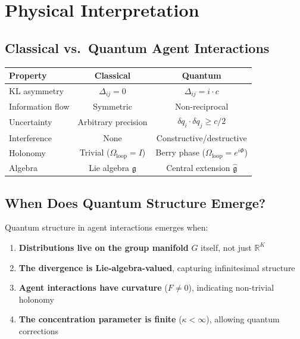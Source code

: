 \documentclass[11pt,a4paper]{article}
\newcommand{\R}{\mathbb{R}}
\begin{document}
\section{Physical Interpretation}

\subsection{Classical vs.\ Quantum Agent Interactions}

\begin{center}
\begin{tabular}{|l|c|c|}
\hline
\textbf{Property} & \textbf{Classical} & \textbf{Quantum} \\
\hline
KL asymmetry & $\Delta_{ij} = 0$ & $\Delta_{ij} = i \cdot c$ \\
Information flow & Symmetric & Non-reciprocal \\
Uncertainty & Arbitrary precision & $\delta q_i \cdot \delta q_j \geq c/2$ \\
Interference & None & Constructive/destructive \\
Holonomy & Trivial ($\Omega_{\text{loop}} = I$) & Berry phase ($\Omega_{\text{loop}} = e^{i\Phi}$) \\
Algebra & Lie algebra $\mathfrak{g}$ & Central extension $\hat{\mathfrak{g}}$ \\
\hline
\end{tabular}
\end{center}

\subsection{When Does Quantum Structure Emerge?}

Quantum structure in agent interactions emerges when:

\begin{enumerate}
    \item \textbf{Distributions live on the group manifold} $G$ itself, not just $\R^K$

    \item \textbf{The divergence is Lie-algebra-valued}, capturing infinitesimal structure

    \item \textbf{Agent interactions have curvature} ($F \neq 0$), indicating non-trivial holonomy

    \item \textbf{The concentration parameter is finite} ($\kappa < \infty$), allowing quantum corrections
\end{enumerate}
\end{document}
